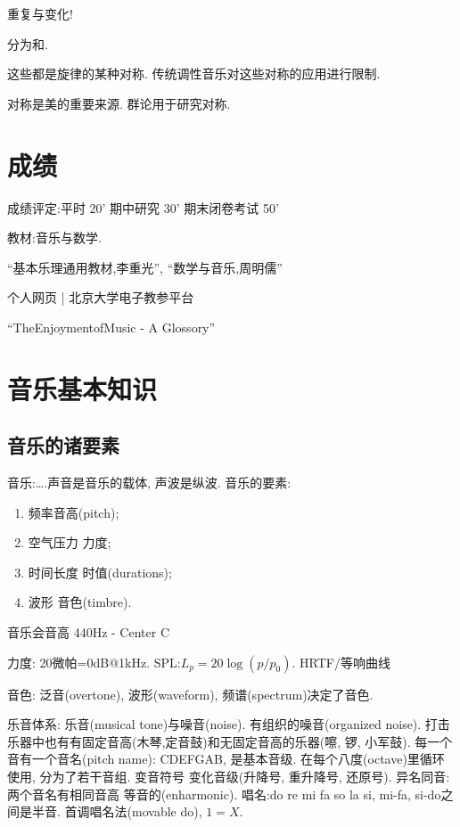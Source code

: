 \documentclass{article}
\begin{document}
    重复与变化!

     分为和.

    
    这些都是旋律的某种对称. 传统调性音乐对这些对称的应用进行限制.

    对称是美的重要来源. 群论用于研究对称.

\section{成绩}

成绩评定:平时 20' 期中研究 30' 期末闭卷考试 50'

教材:音乐与数学.

``基本乐理通用教材,李重光'', ``数学与音乐,周明儒''

个人网页 | 北京大学电子教参平台

``TheEnjoymentofMusic - A Glossory''

\section{音乐基本知识}
\subsection{音乐的诸要素}
    音乐:\dots .声音是音乐的载体, 声波是纵波. 
    音乐的要素: 
    \begin{enumerate}
        \item 频率\trarr 音高(pitch);
        \item 空气压力 \trarr 力度;
        \item 时间长度 \trarr 时值(durations);
        \item 波形 \trarr 音色(timbre).
    \end{enumerate}   

    音乐会音高 440Hz - Center C

    力度: 20微帕=0dB@1kHz. SPL:$L_p=20\log (p/p_0)$. HRTF/等响曲线

    音色: 泛音(overtone), 波形(waveform), 频谱(spectrum)决定了音色.

    乐音体系: 乐音(musical tone)与噪音(noise). 有组织的噪音(organized noise). 打击乐器中也有有固定音高(木琴,定音鼓)和无固定音高的乐器(嚓, 锣, 小军鼓). 每一个音有一个音名(pitch name): CDEFGAB, 是基本音级. 在每个八度(octave)里循环使用, 分为了若干音组. 变音符号 \trarr 变化音级(升降号, 重升降号, 还原号). 异名同音:两个音名有相同音高 \trarr 等音的(enharmonic). 唱名:do re mi fa so la si, mi-fa, si-do之间是半音. 首调唱名法(movable do), $1=X$.
\end{document}

